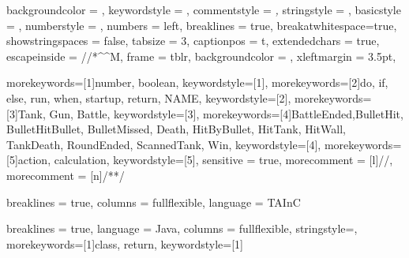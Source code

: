 
\usepackage{listings}


\captionsetup[lstlisting]{
    format = listing
}

\lstset 
{
    backgroundcolor = \color{white},
    keywordstyle = \color{blue},
    commentstyle = \color{gray!75}\textit,
    stringstyle = \color{green},
    basicstyle = \scriptsize\ttfamily,
    numberstyle = \tiny,
    numbers = left,
    breaklines = true,
    breakatwhitespace=true,
    showstringspaces = false,
    tabsize = 3,
    captionpos = t,
    extendedchars = true,
    escapeinside = {//*}{\^^M}, %
    frame = tblr,
    backgroundcolor = \color{gray!5},
    xleftmargin = 3.5pt,
}

\renewcommand{\lstlistingname}{Code Snippet}

\captionsetup[lstlisting]{format = listing, labelfont = white, textfont = white}

{
    morekeywords=[1]{number, boolean}, 
    keywordstyle=[1]\color{NavyBlue},
    morekeywords=[2]{do, if, else, run, when, startup, return, NAME},
    keywordstyle=[2]\color{Magenta},
    morekeywords=[3]{Tank, Gun, Battle},
    keywordstyle=[3]\color{Green},
    morekeywords=[4]{BattleEnded,BulletHit, BulletHitBullet, BulletMissed, Death, HitByBullet, HitTank, HitWall, TankDeath, RoundEnded, ScannedTank, Win},
    keywordstyle=[4]\color{Bittersweet},
    morekeywords=[5]{action, calculation},
    keywordstyle=[5]\color{Fuchsia},
    sensitive = true,
    morecomment = [l]{//},
    morecomment = [n]{/*}{*/}
}

{
    breaklines = true,
    columns = fullflexible,
    language = TAInC
}

\newcommand{\taincinline}[1]{\lstinline[style = tainc, basicstyle = \ttfamily\normalsize]{#1}}


{
    breaklines = true,
    language = Java,
    columns = fullflexible,
    stringstyle=\color{eclipse_blue},
    morekeywords=[1]{class, return}, 
    keywordstyle=[1]\color{eclipse_red}
}

